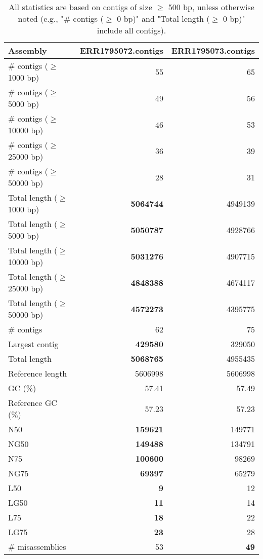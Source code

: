 \documentclass[12pt,a4paper]{article}
\begin{document}
\begin{table}[ht]
\begin{center}
\caption{All statistics are based on contigs of size $\geq$ 500 bp, unless otherwise noted (e.g., "\# contigs ($\geq$ 0 bp)" and "Total length ($\geq$ 0 bp)" include all contigs).}
\begin{tabular}{|l*{2}{|r}|}
\hline
Assembly & ERR1795072.contigs & ERR1795073.contigs \\ \hline
\# contigs ($\geq$ 1000 bp) & 55 & 65 \\ \hline
\# contigs ($\geq$ 5000 bp) & 49 & 56 \\ \hline
\# contigs ($\geq$ 10000 bp) & 46 & 53 \\ \hline
\# contigs ($\geq$ 25000 bp) & 36 & 39 \\ \hline
\# contigs ($\geq$ 50000 bp) & 28 & 31 \\ \hline
Total length ($\geq$ 1000 bp) & {\bf 5064744} & 4949139 \\ \hline
Total length ($\geq$ 5000 bp) & {\bf 5050787} & 4928766 \\ \hline
Total length ($\geq$ 10000 bp) & {\bf 5031276} & 4907715 \\ \hline
Total length ($\geq$ 25000 bp) & {\bf 4848388} & 4674117 \\ \hline
Total length ($\geq$ 50000 bp) & {\bf 4572273} & 4395775 \\ \hline
\# contigs & 62 & 75 \\ \hline
Largest contig & {\bf 429580} & 329050 \\ \hline
Total length & {\bf 5068765} & 4955435 \\ \hline
Reference length & 5606998 & 5606998 \\ \hline
GC (\%) & 57.41 & 57.49 \\ \hline
Reference GC (\%) & 57.23 & 57.23 \\ \hline
N50 & {\bf 159621} & 149771 \\ \hline
NG50 & {\bf 149488} & 134791 \\ \hline
N75 & {\bf 100600} & 98269 \\ \hline
NG75 & {\bf 69397} & 65279 \\ \hline
L50 & {\bf 9} & 12 \\ \hline
LG50 & {\bf 11} & 14 \\ \hline
L75 & {\bf 18} & 22 \\ \hline
LG75 & {\bf 23} & 28 \\ \hline
\# misassemblies & 53 & {\bf 49} \\ \hline

\end{tabular}
\end{center}
\end{table}
\end{document}
